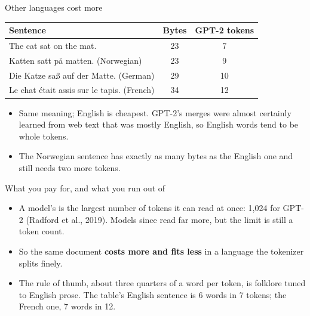 \documentclass[aspectratio=169,11pt,t,\primeropts]{beamer}
\begin{document}
\begin{frame}{Other languages cost more}
  \begin{center}\small
  \begin{tabular}{@{}lcc@{}}
    \toprule
    \textbf{Sentence} & \textbf{Bytes} & \textbf{GPT-2 tokens}\\
    \midrule
    The cat sat on the mat. & 23 & 7\\
    Katten satt på matten. (Norwegian) & 23 & 9\\
    Die Katze saß auf der Matte. (German) & 29 & 10\\
    Le chat était assis sur le tapis. (French) & 34 & 12\\
    \bottomrule
  \end{tabular}
  \end{center}
  \begin{itemize}
    \item Same meaning; English is cheapest. GPT-2's merges were almost certainly learned from web
      text that was mostly English, so English words tend to be whole tokens.
    \item<2-> The Norwegian sentence has exactly as many bytes as the English one and still needs
      two more tokens.
  \end{itemize}
\end{frame}

\begin{frame}{What you pay for, and what you run out of}
  \begin{itemize}
    \item A model's  is the largest number of tokens it can read at once:
      1,024 for GPT-2 (Radford et al., 2019). Models since read far more, but the limit is still a
      token count.
    \item<2-> So the same document \textbf{costs more and fits less} in a language the tokenizer
      splits finely.
    \item<3-> The rule of thumb, about three quarters of a word per token, is folklore tuned to
      English prose. The table's English sentence is 6 words in 7 tokens; the French one, 7 words
      in 12.
  \end{itemize}
\end{frame}
\end{document}
